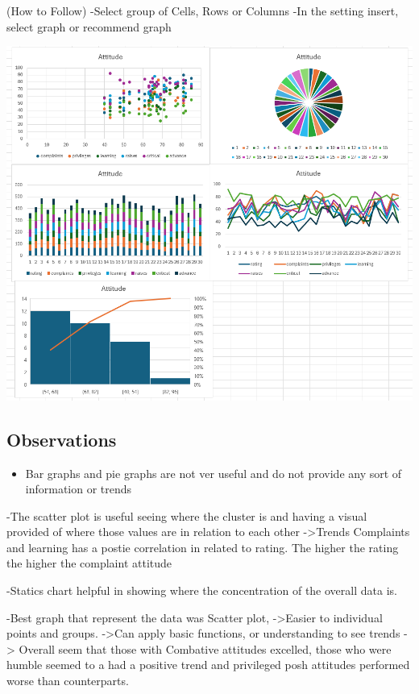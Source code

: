 \documentclass[
  letterpaper,
  DIV=11,
  numbers=noendperiod]{scrreprt}
\providecommand{\tightlist}{%
  \setlength{\itemsep}{0pt}\setlength{\parskip}{0pt}}\usepackage{longtable,booktabs,array}
\begin{document}
(How to Follow) -Select group of Cells, Rows or Columns -In the setting
insert, select graph or recommend graph

\includegraphics{./Excel_1_Unit/Week1_Diego/Week_1DJ/screenshots/Attitude_Base3.png}

\subsection{Observations}\label{observations-2}

\begin{itemize}
\tightlist
\item
  Bar graphs and pie graphs are not ver useful and do not provide any
  sort of information or trends
\end{itemize}

-The scatter plot is useful seeing where the cluster is and having a
visual provided of where those values are in relation to each other
-\textgreater Trends Complaints and learning has a postie correlation in
related to rating. The higher the rating the higher the complaint
attitude

-Statics chart helpful in showing where the concentration of the overall
data is.

-Best graph that represent the data was Scatter plot,
-\textgreater Easier to individual points and groups. -\textgreater Can
apply basic functions, or understanding to see trends -\textgreater{}
Overall seem that those with Combative attitudes excelled, those who
were humble seemed to a had a positive trend and privileged posh
attitudes performed worse than counterparts.
\end{document}

